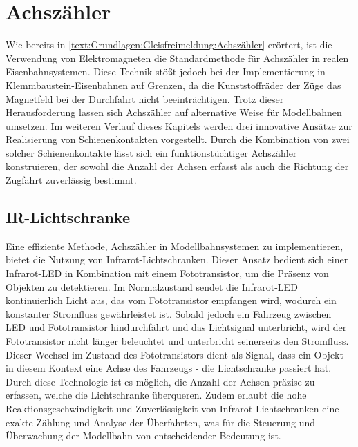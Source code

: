 \section{Achszähler}\label{text:Methodik:Achszähler}

Wie bereits in \autoref{text:Grundlagen:Gleisfreimeldung:Achszähler}  erörtert, ist die Verwendung von Elektromagneten die Standardmethode für Achszähler in realen Eisenbahnsystemen. Diese Technik stößt jedoch bei der Implementierung in Klemmbaustein-Eisenbahnen auf Grenzen, da die Kunststoffräder der Züge das Magnetfeld bei der Durchfahrt nicht beeinträchtigen. Trotz dieser Herausforderung lassen sich Achszähler auf alternative Weise für Modellbahnen umsetzen.
\newline
Im weiteren Verlauf dieses Kapitels werden drei innovative Ansätze zur Realisierung von Schienenkontakten vorgestellt. Durch die Kombination von zwei solcher Schienenkontakte lässt sich ein funktionstüchtiger Achszähler konstruieren, der sowohl die Anzahl der Achsen erfasst als auch die Richtung der Zugfahrt zuverlässig bestimmt.

\subsection{IR-Lichtschranke}\label{text:Methodik:Achszähler:Lichtschranke}

Eine effiziente Methode, Achszähler in Modellbahnsystemen zu implementieren, bietet die Nutzung von Infrarot-Lichtschranken. Dieser Ansatz bedient sich einer Infrarot-LED in Kombination mit einem Fototransistor, um die Präsenz von Objekten zu detektieren. Im Normalzustand sendet die Infrarot-LED kontinuierlich Licht aus, das vom Fototransistor empfangen wird, wodurch ein konstanter Stromfluss gewährleistet ist. Sobald jedoch ein Fahrzeug zwischen LED und Fototransistor hindurchfährt und das Lichtsignal unterbricht, wird der Fototransistor nicht länger beleuchtet und unterbricht seinerseits den Stromfluss. Dieser Wechsel im Zustand des Fototransistors dient als Signal, dass ein Objekt - in diesem Kontext eine Achse des Fahrzeugs - die Lichtschranke passiert hat.
\newline
Durch diese Technologie ist es möglich, die Anzahl der Achsen präzise zu erfassen, welche die Lichtschranke überqueren. Zudem erlaubt die hohe Reaktionsgeschwindigkeit und Zuverlässigkeit von Infrarot-Lichtschranken eine exakte Zählung und Analyse der Überfahrten, was für die Steuerung und Überwachung der Modellbahn von entscheidender Bedeutung ist. 


